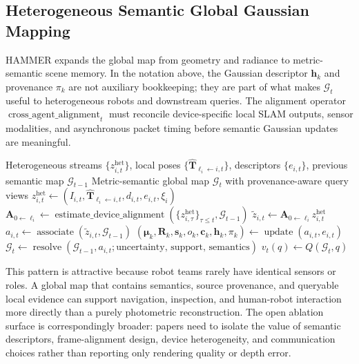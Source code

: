 \documentclass[11pt, a4paper, logo]{googledeepmind}
\begin{document}
\subsection{Heterogeneous Semantic Global Gaussian Mapping}

HAMMER expands the global map from geometry and radiance to metric-semantic scene memory. In the notation above, the Gaussian descriptor $\mathbf{h}_k$ and provenance $\pi_k$ are not auxiliary bookkeeping; they are part of what makes $\mathcal{G}_t$ useful to heterogeneous robots and downstream queries. The alignment operator $\operatorname{cross\_agent\_alignment}_t$ must reconcile device-specific local SLAM outputs, sensor modalities, and asynchronous packet timing before semantic Gaussian updates are meaningful.

\begin{algorithm}[H]
\caption{Heterogeneous semantic global Gaussian mapping pattern}
\label{alg:taxonomy-heterogeneous-semantic}
\small
\begin{algorithmic}[1]
  \Require Heterogeneous streams $\{z_{i,t}^{\mathrm{het}}\}$, local poses $\{\hat{\mathbf{T}}_{\ell_i\leftarrow i,t}\}$, descriptors $\{e_{i,t}\}$, previous semantic map $\mathcal{G}_{t-1}$
  \Ensure Metric-semantic global map $\mathcal{G}_t$ with provenance-aware query views
  \State $z_{i,t}^{\mathrm{het}} \gets (I_{i,t},\hat{\mathbf{T}}_{\ell_i\leftarrow i,t},d_{i,t},e_{i,t},\xi_i)$ 
  \State $\mathbf{A}_{0\leftarrow\ell_i} \gets \operatorname{estimate\_device\_alignment}(\{z_{i,\tau}^{\mathrm{het}}\}_{\tau\leq t},\mathcal{G}_{t-1})$ 
  \State $\tilde{z}_{i,t} \gets \mathbf{A}_{0\leftarrow\ell_i}z_{i,t}^{\mathrm{het}}$ 
  \State $a_{i,t} \gets \operatorname{associate}(\tilde{z}_{i,t},\mathcal{G}_{t-1})$ 
  \State $(\boldsymbol{\mu}_k,\mathbf{R}_k,\mathbf{s}_k,o_k,\mathbf{c}_k,\mathbf{h}_k,\pi_k) \gets \operatorname{update}(a_{i,t},e_{i,t})$ 
  \State $\mathcal{G}_t \gets \operatorname{resolve}(\mathcal{G}_{t-1},a_{i,t};\text{uncertainty, support, semantics})$ 
  \State $v_t(q) \gets Q(\mathcal{G}_t,q)$ 
\end{algorithmic}
\end{algorithm}

This pattern is attractive because robot teams rarely have identical sensors or roles. A global map that contains semantics, source provenance, and queryable local evidence can support navigation, inspection, and human-robot interaction more directly than a purely photometric reconstruction. The open ablation surface is correspondingly broader: papers need to isolate the value of semantic descriptors, frame-alignment design, device heterogeneity, and communication choices rather than reporting only rendering quality or depth error.
\end{document}
